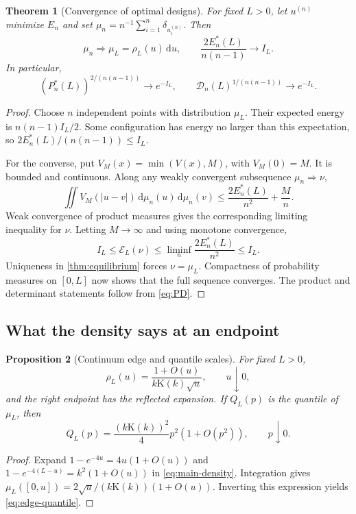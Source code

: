 \documentclass[11pt,a4paper]{article}
\newtheorem{theorem}{Theorem}[section]
\newtheorem{proposition}[theorem]{Proposition}
\theoremstyle{definition}
\theoremstyle{remark}
\newcommand{\dd}{\,\mathrm d}
\newcommand{\E}{\mathcal E}
\newcommand{\Dopt}{\mathcal D}
\newcommand{\K}{\mathrm K}
\begin{document}
\begin{theorem}[Convergence of optimal designs]
\label{thm:convergence}
For fixed $L>0$, let $u^{(n)}$ minimize $E_n$ and set
$\mu_n=n^{-1}\sum_{i=1}^n\delta_{u_i^{(n)}}$. Then
\begin{equation}
 \mu_n\Rightarrow\mu_L=\rho_L(u)\dd u,
 \qquad
 \frac{2E_n^*(L)}{n(n-1)}\longrightarrow I_L.
 \label{eq:weakconvergence}
\end{equation}
In particular,
\begin{equation}
 (P_n^*(L))^{2/(n(n-1))}\longrightarrow e^{-I_L},\qquad
 \Dopt_n(L)^{1/(n(n-1))}\longrightarrow e^{-I_L}.
 \label{eq:capacitylimits}
\end{equation}
\end{theorem}
\begin{proof}
Choose $n$ independent points with distribution $\mu_L$. Their expected
energy is $n(n-1)I_L/2$. Some configuration has energy no larger than this
expectation, so $2E_n^*(L)/(n(n-1))\le I_L$.

For the converse, put $V_M(x)=\min(V(x),M)$, with $V_M(0)=M$. It is bounded
and continuous. Along any weakly convergent subsequence $\mu_n\Rightarrow\nu$,
\[
 \iint V_M(|u-v|)\dd\mu_n(u)\dd\mu_n(v)
 \le\frac{2E_n^*(L)}{n^2}+\frac Mn.
\]
Weak convergence of product measures gives the corresponding limiting
inequality for $\nu$. Letting $M\to\infty$ and using monotone convergence,
\[
 I_L\le\E_L(\nu)\le\liminf_n\frac{2E_n^*(L)}{n^2}\le I_L.
\]
Uniqueness in \cref{thm:equilibrium} forces $\nu=\mu_L$. Compactness of
probability measures on $[0,L]$ now shows that the full sequence converges.
The product and determinant statements follow from \eqref{eq:PD}.
\end{proof}

\subsection{What the density says at an endpoint}
\begin{proposition}[Continuum edge and quantile scales]
\label{prop:edges}
For fixed $L>0$,
\begin{equation}
 \rho_L(u)=\frac{1+O(u)}{k\K(k)\sqrt u},\qquad u\downarrow0,
 \label{eq:edge-density}
\end{equation}
and the right endpoint has the reflected expansion. If $Q_L(p)$ is the
quantile of $\mu_L$, then
\begin{equation}
 Q_L(p)=\frac{(k\K(k))^2}{4}p^2(1+O(p^2)),\qquad p\downarrow0.
 \label{eq:edge-quantile}
\end{equation}
\end{proposition}
\begin{proof}
Expand $1-e^{-4u}=4u(1+O(u))$ and
$1-e^{-4(L-u)}=k^2(1+O(u))$ in \eqref{eq:main-density}. Integration gives
$\mu_L([0,u])=2\sqrt u/(k\K(k))(1+O(u))$. Inverting this expression yields
\eqref{eq:edge-quantile}.
\end{proof}
\end{document}
